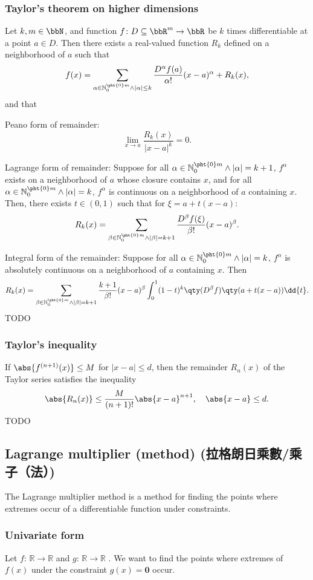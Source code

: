\subsubsection{Taylor's theorem on higher dimensions}
Let $k,m\in\bbN$, and function $f\colon D\subseteq\bbR^m\to\bbR$ be $k$ times differentiable at a point $a\in D$. Then there exists a real-valued function $R_k$ defined on a neighborhood of $a$ such that
\[f(x)=\sum_{\alpha\in\mathbb{N}_0^{\pht{0}m}\land |\alpha|\leq k}\frac{D^{\alpha}f(a)}{\alpha !}(x-a)^{\alpha}+R_k(x),\]
and that
\bit
\item Peano form of remainder:
\[\lim_{x\to a}\frac{R_k(x)}{|x-a|^k}=0.\]
\item Lagrange form of remainder: Suppose for all $\alpha\in\mathbb{N}_0^{\pht{0}m}\land |\alpha|=k+1$, $f^{\alpha}$ exists on a neighborhood of $a$ whose closure contains $x$, and for all $\alpha\in\mathbb{N}_0^{\pht{0}m}\land |\alpha|=k$, $f^{\alpha}$ is continuous on a neighborhood of $a$ containing $x$. Then, there exists $t\in (0,1)$ such that for $\xi=a+t(x-a)$:
\[R_k(x)=\sum_{\beta\in\mathbb{N}_0^{\pht{0}m}\land |\beta|=k+1}\frac{D^{\beta}f(\xi)}{\beta!}(x-a)^{\beta}.\]
\item Integral form of the remainder: Suppose for all $\alpha\in\mathbb{N}_0^{\pht{0}m}\land |\alpha|=k$, $f^{\alpha}$ is absolutely continuous on a neighborhood of $a$ containing $x$. Then
\[R_k(x)=\sum_{\beta\in\mathbb{N}_0^{\pht{0}m}\land |\beta|=k+1}\frac{k+1}{\beta!}(x-a)^{\beta}\int_0^1(1-t)^k\qty(D^{\beta}f)\qty(a+t(x-a))\dd{t}.\]
\eit
\bpr
TODO
\epr
\subsubsection{Taylor's inequality}
If $\abs{f^{(n+1)}(x)}\leq M$ for $|x-a|\le d$, then the remainder $R_n(x)$ of the Taylor series satisfies the inequality
\[\abs{R_n(x)}\le\frac{M}{(n+1)!}\abs{x-a}^{n+1},\quad\abs{x-a}\le d.\]
\bpr
TODO
\epr
\subsection{Lagrange multiplier (method) (拉格朗日乘數/乘子（法）)}
The Lagrange multiplier method is a method for finding the points where extremes occur of a differentiable function under constraints.
\subsubsection{Univariate form}
Let $f:\,\mathbb{R} \rightarrow \mathbb{R}$ and $g:\,\mathbb{R} \rightarrow \mathbb{R}$ . We want to find the points where extremes of \( f(x) \) under the constraint \( g(x) = \mathbf{0} \) occur. 

